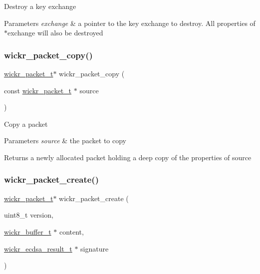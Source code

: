 Destroy a key exchange


\begin{DoxyParams}{Parameters}
{\em exchange} & a pointer to the key exchange to destroy. All properties of \textquotesingle{}$\ast$exchange\textquotesingle{} will also be destroyed \\
\hline
\end{DoxyParams}
\mbox{\label{group__wickr__protocol_ga0c95ad86819bacf98c11115d748039db}} 
\subsubsection{\texorpdfstring{wickr\+\_\+packet\+\_\+copy()}{wickr\_packet\_copy()}}
{\footnotesize\ttfamily \hyperlink{structwickr__packet}{wickr\+\_\+packet\+\_\+t}$\ast$ wickr\+\_\+packet\+\_\+copy (\begin{DoxyParamCaption}\item[{const \hyperlink{structwickr__packet}{wickr\+\_\+packet\+\_\+t} $\ast$}]{source }\end{DoxyParamCaption})}

Copy a packet


\begin{DoxyParams}{Parameters}
{\em source} & the packet to copy \\
\hline
\end{DoxyParams}
\begin{DoxyReturn}{Returns}
a newly allocated packet holding a deep copy of the properties of \textquotesingle{}source\textquotesingle{} 
\end{DoxyReturn}
\mbox{\label{group__wickr__protocol_gac952913ddaf848d2def181cd55b30883}} 
\subsubsection{\texorpdfstring{wickr\+\_\+packet\+\_\+create()}{wickr\_packet\_create()}}
{\footnotesize\ttfamily \hyperlink{structwickr__packet}{wickr\+\_\+packet\+\_\+t}$\ast$ wickr\+\_\+packet\+\_\+create (\begin{DoxyParamCaption}\item[{uint8\+\_\+t}]{version,  }\item[{\hyperlink{structwickr__buffer}{wickr\+\_\+buffer\+\_\+t} $\ast$}]{content,  }\item[{\hyperlink{structwickr__ecdsa__result}{wickr\+\_\+ecdsa\+\_\+result\+\_\+t} $\ast$}]{signature }\end{DoxyParamCaption})}

